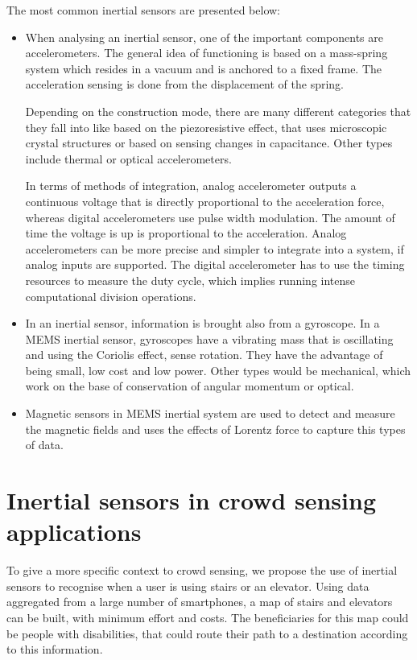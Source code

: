 The most common inertial sensors are presented below:

\begin{itemize}
  \item When analysing an inertial sensor, one of the important components are accelerometers. The general idea of
functioning is based on a mass-spring system which
resides in a vacuum and is anchored to a fixed frame. The
acceleration sensing is done from the displacement of the
spring.

Depending on the construction mode, there are many
different categories that they fall into like based on the piezoresistive effect, that uses microscopic crystal structures or based on sensing changes in capacitance. Other types include thermal or optical accelerometers.

In terms of methods of integration, analog accelerometer
outputs a continuous voltage that is directly proportional
to the acceleration force, whereas digital accelerometers
use pulse width modulation. The amount of time
the voltage is up is proportional to the acceleration.
Analog accelerometers can be more precise and simpler
to integrate into a system, if analog inputs are supported.
The digital accelerometer has to use the timing resources
to measure the duty cycle, which implies running intense
computational division operations.
  \item In an inertial sensor, information is brought also from
a gyroscope.  In a MEMS inertial sensor, gyroscopes have a vibrating mass that is oscillating and using the Coriolis
effect, sense rotation. They have the advantage of being
small, low cost and low power. Other types would be mechanical, which work on the base of conservation of angular momentum or optical.
\item Magnetic sensors in MEMS inertial system are used to detect and measure the magnetic fields and uses the effects of Lorentz force to capture this types of data.
\end{itemize}

\section{Inertial sensors in crowd sensing applications}
\label{sec:intro-acc-crowd}

To give a more specific context to crowd sensing, we propose the use of inertial sensors to recognise when a user is using stairs or an elevator. Using data aggregated from a large number of smartphones, a map of stairs and elevators can be built, with minimum effort and costs. The beneficiaries for this map could be people with disabilities, that could route their path to a destination according to this information.


